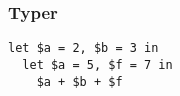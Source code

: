 \begin{frame}[fragile]
\frametitle{Typer}
\begin{lstlisting}
let $a = 2, $b = 3 in 
  let $a = 5, $f = 7 in
    $a + $b + $f
\end{lstlisting}
\begin{center}
\end{center}
\end{frame}



